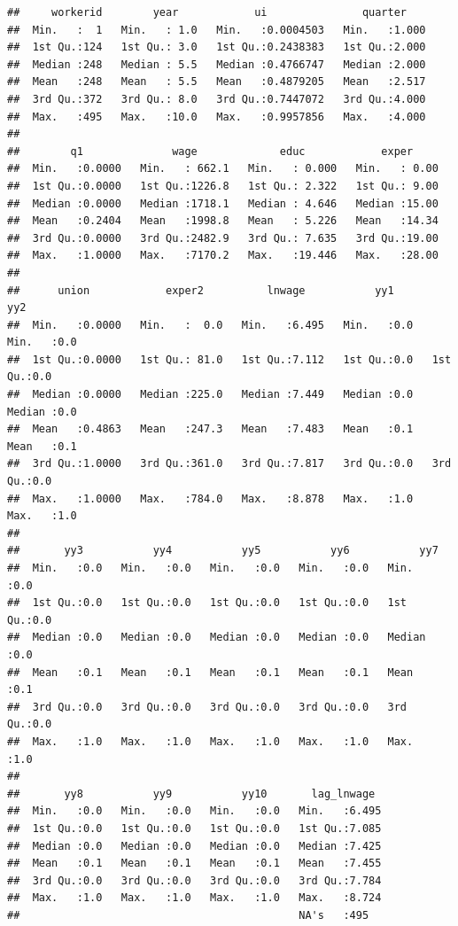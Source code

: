 \documentclass[
]{article}
\begin{document}
\begin{verbatim}
##     workerid        year            ui               quarter     
##  Min.   :  1   Min.   : 1.0   Min.   :0.0004503   Min.   :1.000  
##  1st Qu.:124   1st Qu.: 3.0   1st Qu.:0.2438383   1st Qu.:2.000  
##  Median :248   Median : 5.5   Median :0.4766747   Median :2.000  
##  Mean   :248   Mean   : 5.5   Mean   :0.4879205   Mean   :2.517  
##  3rd Qu.:372   3rd Qu.: 8.0   3rd Qu.:0.7447072   3rd Qu.:4.000  
##  Max.   :495   Max.   :10.0   Max.   :0.9957856   Max.   :4.000  
##                                                                  
##        q1              wage             educ            exper      
##  Min.   :0.0000   Min.   : 662.1   Min.   : 0.000   Min.   : 0.00  
##  1st Qu.:0.0000   1st Qu.:1226.8   1st Qu.: 2.322   1st Qu.: 9.00  
##  Median :0.0000   Median :1718.1   Median : 4.646   Median :15.00  
##  Mean   :0.2404   Mean   :1998.8   Mean   : 5.226   Mean   :14.34  
##  3rd Qu.:0.0000   3rd Qu.:2482.9   3rd Qu.: 7.635   3rd Qu.:19.00  
##  Max.   :1.0000   Max.   :7170.2   Max.   :19.446   Max.   :28.00  
##                                                                    
##      union            exper2          lnwage           yy1           yy2     
##  Min.   :0.0000   Min.   :  0.0   Min.   :6.495   Min.   :0.0   Min.   :0.0  
##  1st Qu.:0.0000   1st Qu.: 81.0   1st Qu.:7.112   1st Qu.:0.0   1st Qu.:0.0  
##  Median :0.0000   Median :225.0   Median :7.449   Median :0.0   Median :0.0  
##  Mean   :0.4863   Mean   :247.3   Mean   :7.483   Mean   :0.1   Mean   :0.1  
##  3rd Qu.:1.0000   3rd Qu.:361.0   3rd Qu.:7.817   3rd Qu.:0.0   3rd Qu.:0.0  
##  Max.   :1.0000   Max.   :784.0   Max.   :8.878   Max.   :1.0   Max.   :1.0  
##                                                                              
##       yy3           yy4           yy5           yy6           yy7     
##  Min.   :0.0   Min.   :0.0   Min.   :0.0   Min.   :0.0   Min.   :0.0  
##  1st Qu.:0.0   1st Qu.:0.0   1st Qu.:0.0   1st Qu.:0.0   1st Qu.:0.0  
##  Median :0.0   Median :0.0   Median :0.0   Median :0.0   Median :0.0  
##  Mean   :0.1   Mean   :0.1   Mean   :0.1   Mean   :0.1   Mean   :0.1  
##  3rd Qu.:0.0   3rd Qu.:0.0   3rd Qu.:0.0   3rd Qu.:0.0   3rd Qu.:0.0  
##  Max.   :1.0   Max.   :1.0   Max.   :1.0   Max.   :1.0   Max.   :1.0  
##                                                                       
##       yy8           yy9           yy10       lag_lnwage   
##  Min.   :0.0   Min.   :0.0   Min.   :0.0   Min.   :6.495  
##  1st Qu.:0.0   1st Qu.:0.0   1st Qu.:0.0   1st Qu.:7.085  
##  Median :0.0   Median :0.0   Median :0.0   Median :7.425  
##  Mean   :0.1   Mean   :0.1   Mean   :0.1   Mean   :7.455  
##  3rd Qu.:0.0   3rd Qu.:0.0   3rd Qu.:0.0   3rd Qu.:7.784  
##  Max.   :1.0   Max.   :1.0   Max.   :1.0   Max.   :8.724  
##                                            NA's   :495
\end{verbatim}
\end{document}
